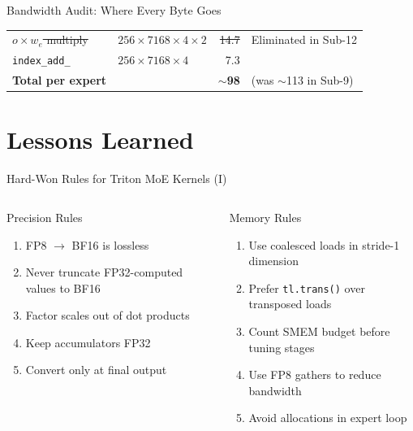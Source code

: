 \documentclass[aspectratio=169,11pt]{beamer}
\begin{document}
\begin{frame}[t]{Bandwidth Audit: Where Every Byte Goes}
\begin{center}
\begin{tabular}{llrl}
\quad \sout{$o \times w_e$ multiply} & \sout{$256 \times 7168 \times 4 \times 2$} & 
    \sout{14.7} & \textcolor{deepgreen}{Eliminated in Sub-12} \\
\quad \texttt{index\_add\_} & $256 \times 7168 \times 4$ & 7.3 & \\
\midrule
\textbf{Total per expert} & & \textbf{$\sim$98} & (was $\sim$113 in Sub-9) \\
\bottomrule
\end{tabular}
\end{center}
\end{frame}

\section{Lessons Learned}

\begin{frame}[t]{Hard-Won Rules for Triton MoE Kernels (I)}
\small
\begin{columns}[T]
\begin{block}{Precision Rules}
\begin{enumerate}
    \item FP8 $\to$ BF16 is lossless
    \item Never truncate FP32-computed values to BF16
    \item Factor scales out of dot products
    \item Keep accumulators FP32
    \item Convert only at final output
\end{enumerate}
\end{block}
\begin{block}{Memory Rules}
\begin{enumerate}
    \item Use coalesced loads in stride-1 dimension
    \item Prefer \texttt{tl.trans()} over transposed loads
    \item Count SMEM budget before tuning stages
    \item Use FP8 gathers to reduce bandwidth
    \item Avoid allocations in expert loop
\end{enumerate}
\end{block}
\end{columns}
\end{frame}
\end{document}
